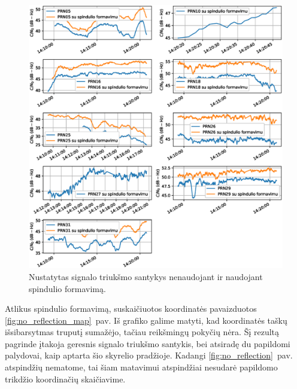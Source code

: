 \documentclass[main.tex]{subfiles}
\begin{document}
\begin{figure}[ht]
    \begin{centering}
    \includegraphics[scale=0.6]{drawings/no_refelection_snr}
    \par\end{centering}
    \protect\caption{\label{fig:no_reflection_snr}Nustatytas signalo triukšmo santykys nenaudojant ir naudojant spindulio formavimą.}
\end{figure}

Atlikus spindulio formavimą, suskaičiuotos koordinatės pavaizduotos \ref{fig:no_reflection_map}~pav.
Iš grafiko galime matyti, kad koordinatės taškų išsibarsytmas truputį sumažėjo, tačiau reikšmingų
pokyčių nėra. Šį rezultą pagrinde įtakoja geresnis signalo triukšmo santykis, bei atsiradę du papildomi
palydovai, kaip aptarta šio skyrelio pradžioje. Kadangi \ref{fig:no_reflection}~pav. atspindžių
nematome, tai šiam matavimui atspindžiai nesudarė papildomo trikdžio koordinačių skaičiavime.
\end{document}
